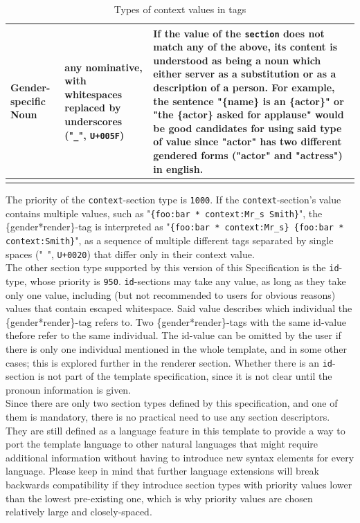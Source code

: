 \documentclass{article}
\begin{document}
\begin{flushleft}
\begin{center}
\begin{longtable}{| >{\raggedright\arraybackslash}p{7em} | >{\raggedright\arraybackslash}p{9em} | >{\raggedright\arraybackslash}p{14em} |}
                 \hline
                 Gender-specific Noun & any nominative, with whitespaces replaced by underscores ("\texttt{\_}", \texttt{U+005F}) & If the value of the \texttt{section} does not match any of the above, its content is understood as being a noun which either server as a substitution or as a description of a person.
                 For example, the sentence "\{name\} is an \{actor\}" or "the \{actor\} asked for applause" would be good candidates for using said type of value since "actor" has two different gendered forms ("actor" and "actress") in english. \\
                 \hline
                \caption{Types of context values in tags}
            \end{longtable}
        \end{center}
    \end{flushleft}

    The priority of the \texttt{context}-section type is \texttt{1000}.
    If the \texttt{context}-section's value contains multiple values, such as "\texttt{\{foo:bar * context:Mr\_s Smith\}}", the \{gender*render\}-tag is interpreted as "\texttt{\{foo:bar * context:Mr\_s\} \{foo:bar * context:Smith\}}", as a sequence of multiple different tags separated by single spaces ("\texttt{ }", \texttt{U+0020}) that differ only in their context value.\\

    The other section type supported by this version of this Specification is the \texttt{id}-type, whose priority is \texttt{950}.
    \texttt{id}-sections may take any value, as long as they take only one value, including (but not recommended to users for obvious reasons) values that contain escaped whitespace.
    Said value describes which individual the \{gender*render\}-tag refers to.
    Two \{gender*render\}-tags with the same id-value thefore refer to the same individual.
    The id-value can be omitted by the user if there is only one individual mentioned in the whole template, and in some other cases;
    this is explored further in the renderer section.
    Whether there is an \texttt{id}-section is not part of the template specification, since it is not clear until the pronoun information is given.\\

    Since there are only two section types defined by this specification, and one of them is mandatory, there is no practical need to use any section descriptors.
    They are still defined as a language feature in this template to provide a way to port the template language to other natural languages that might require additional information without having to introduce new syntax elements for every language.
    Please keep in mind that further language extensions will break backwards compatibility if they introduce section types with priority values lower than the lowest pre-existing one, which is why priority values are chosen relatively large and closely-spaced.\\
\end{document}
